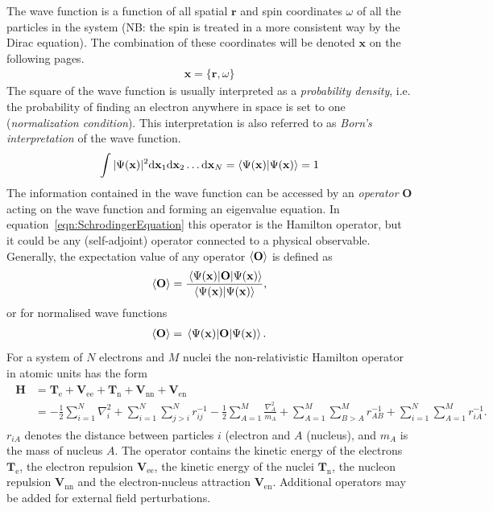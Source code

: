 The wave function is a function of all spatial $\mathbf{r}$ and spin
coordinates $\omega$ of all the particles in the system (NB: the spin
is treated in a more consistent way by the Dirac equation). The combination of
these coordinates will be denoted $\mathbf{x}$ on the following pages.  
%
\begin{align}
	\mathbf{x}=\{\mathbf{r},\omega\}
\end{align}
%
The square of the wave function is usually interpreted as a \textit{probability
density}, i.e. the probability of finding an
electron anywhere in space is set to one (\textit{normalization condition}). This interpretation is also referred to as
\textit{Born's interpretation} of the wave
function.\autocite{Born_ZurQuantenmechanikStossvorgaenge_1926,Born_AdiabatenprinzipQuantenmechanik_1927}
%
\begin{align}
	\int |\Psi(\mathbf{x})|^2\dd \mathbf{x}_1\dd \mathbf{x}_2\ldots\dd \mathbf{x}_N=\braket{\Psi(\mathbf{x})}=1
\end{align}
%
The information contained in the wave function can be accessed by an \textit{operator}
$\mathbf{O}$ acting on the wave function and forming an eigenvalue equation. In
equation~\eqref{eqn:SchrodingerEquation} this operator is the Hamilton
operator, but it could be any (self-adjoint) operator connected to a physical observable.
Generally, the expectation value of any operator $\expval{\mathbf{O}}$ is
defined as
%
\begin{equation}
    \expval{\mathbf{O}}=\frac{\expval{\mathbf{O}}{\Psi(\mathbf{x})}}{\braket{\Psi(\mathbf{x})}},
\end{equation}
%
or for normalised wave functions
%
\begin{align}
    \expval{\mathbf{O}}=\expval{\mathbf{O}}{\Psi(\mathbf{x})}.
\end{align}
%
For a system of $N$ electrons and $M$ nuclei the non-relativistic Hamilton
operator in atomic units has the form
%
\begin{align}
\begin{aligned}
    \mathbf{H}&=\mathbf{T}_\text{e} + \mathbf{V}_\text{ee} + \mathbf{T}_\text{n} + \mathbf{V}_\text{nn} + \mathbf{V}_\text{en} \\
    &=-\frac{1}{2}\sum_{i=1}^N\nabla_i^2
    + \sum_{i=1}^N\sum_{j>i}^Nr_{ij}^{-1}
    -\frac{1}{2} \sum_{A=1}^M\frac{\nabla_A^2}{m_A}
    + \sum_{A=1}^M\sum_{B>A}^Mr_{AB}^{-1}
    + \sum_{i=1}^N\sum_{A=1}^Mr_{iA}^{-1}.\label{eqn:hamiltonoperator}
\end{aligned}
\end{align}
%
$r_{iA}$ denotes the distance between particles $i$ (electron and $A$ (nucleus), and $m_A$ is the mass of nucleus $A$. 
The operator contains the kinetic energy of the electrons
$\mathbf{T}_\text{e}$, the electron repulsion $\mathbf{V}_\text{ee}$, the
kinetic energy of the nuclei $\mathbf{T}_\text{n}$, the nucleon repulsion
$\mathbf{V}_\text{nn}$ and the electron-nucleus attraction
$\mathbf{V}_\text{en}$. Additional operators may be added for external field perturbations.

